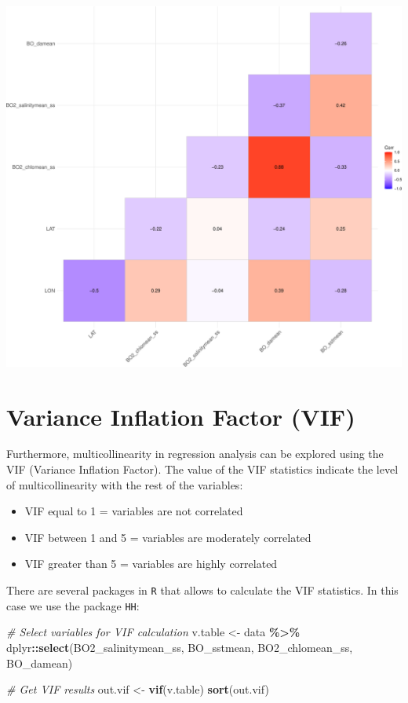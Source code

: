 \documentclass[
]{book}
\newenvironment{Shaded}{\begin{snugshade}}{\end{snugshade}}
\newcommand{\CommentTok}[1]{\textcolor[rgb]{0.56,0.35,0.01}{\textit{#1}}}
\newcommand{\FunctionTok}[1]{\textcolor[rgb]{0.13,0.29,0.53}{\textbf{#1}}}
\newcommand{\NormalTok}[1]{#1}
\newcommand{\OtherTok}[1]{\textcolor[rgb]{0.56,0.35,0.01}{#1}}
\newcommand{\SpecialCharTok}[1]{\textcolor[rgb]{0.81,0.36,0.00}{\textbf{#1}}}
\providecommand{\tightlist}{%
  \setlength{\itemsep}{0pt}\setlength{\parskip}{0pt}}
\begin{document}
\includegraphics{_main_files/figure-latex/unnamed-chunk-52-1.pdf}

\section{Variance Inflation Factor (VIF)}\label{variance-inflation-factor-vif}

Furthermore, multicollinearity in regression analysis can be explored using the VIF (Variance Inflation Factor). The value of the VIF statistics indicate the level of multicollinearity with the rest of the variables:

\begin{itemize}
\tightlist
\item
  VIF equal to 1 = variables are not correlated
\item
  VIF between 1 and 5 = variables are moderately correlated
\item
  VIF greater than 5 = variables are highly correlated
\end{itemize}

There are several packages in \texttt{R} that allows to calculate the VIF statistics. In this case we use the package \texttt{HH}:

\begin{Shaded}
\begin{Highlighting}[]
\CommentTok{\# Select variables for VIF calculation}
\NormalTok{v.table }\OtherTok{\textless{}{-}}\NormalTok{ data }\SpecialCharTok{\%\textgreater{}\%}
\NormalTok{    dplyr}\SpecialCharTok{::}\FunctionTok{select}\NormalTok{(BO2\_salinitymean\_ss, BO\_sstmean,}
\NormalTok{        BO2\_chlomean\_ss, BO\_damean)}

\CommentTok{\# Get VIF results}
\NormalTok{out.vif }\OtherTok{\textless{}{-}} \FunctionTok{vif}\NormalTok{(v.table)}
\FunctionTok{sort}\NormalTok{(out.vif)}
\end{Highlighting}
\end{Shaded}
\end{document}
